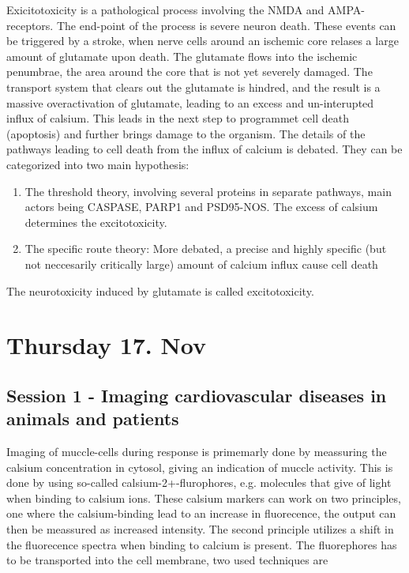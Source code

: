\documentclass[12p]{article}
\begin{document}
Exicitotoxicity is a pathological process involving the NMDA and AMPA-receptors.
The end-point of the process is severe neuron death.
These events can be triggered by a stroke, when nerve cells around an ischemic core relases a large amount of glutamate upon death.
The glutamate flows into the ischemic penumbrae, the area around the core that is not yet severely damaged.
The transport system that clears out the glutamate is hindred, and the result is a massive overactivation of glutamate, leading to an excess and un-interupted influx of calsium.
This leads in the next step to programmet cell death (apoptosis) and further brings damage to the organism.
The details of the pathways leading to cell death from the influx of calcium is debated.
They can be categorized into two main hypothesis:

\begin{enumerate}
\item
The threshold theory, involving several proteins in separate pathways, main actors being CASPASE, PARP1 and PSD95-NOS. The excess of calsium determines the excitotoxicity.
\item
The specific route theory: More debated, a precise and highly specific (but not neccesarily critically large) amount of calcium influx cause cell death
\end{enumerate}


The neurotoxicity induced by glutamate is called excitotoxicity.

\section*{Thursday 17. Nov}

\subsection*{Session 1 - Imaging cardiovascular diseases in animals and patients}

Imaging of muccle-cells during response is primemarly done by meassuring the calsium concentration in cytosol, giving an indication of muccle activity.
This is done by using so-called calsium-2+-flurophores, e.g. molecules that give of light when binding to calsium ions.
These calsium markers can work on two principles, one where the calsium-binding lead to an increase in fluorecence, the output can then be meassured as increased intensity.
The second principle utilizes a shift in the fluorecence spectra when binding to calcium is present.
The fluorephores has to be transported into the cell membrane, two used techniques are 
\end{document}
